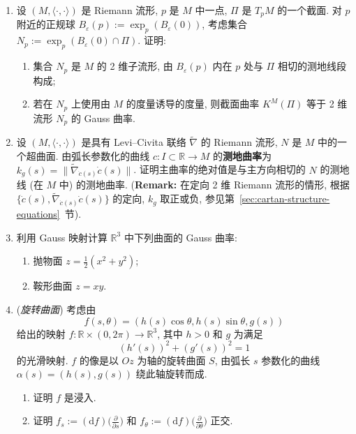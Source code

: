 \begin{RiemannExercise}
\begin{enumerate}[label=(\arabic*),ref=\arabic*,leftmargin=*]
\[
  |K(p)|=\lim_{D\to p}\frac{\operatorname{vol}(g(D))}{\operatorname{vol}(D)},
\]
其中 $g:V\subset N\to S^n$ 是 Gauss 映射, $D$ 是 $p$ 的邻域, 其直径趋于零.
\item\label{ex:sectional-curvature-by-geodesic-surface} 设 $(M,\langle\cdot,\cdot\rangle)$ 是 Riemann 流形, $p$ 是 $M$ 中一点, $\Pi$ 是 $T_pM$ 的一个截面. 对 $p$ 附近的正规球 $B_\varepsilon(p):=\exp_p(B_\varepsilon(0))$, 考虑集合 $N_p:=\exp_p(B_\varepsilon(0)\cap\Pi)$. 证明:
\begin{enumerate}[label=(\alph*),leftmargin=*]
\item 集合 $N_p$ 是 $M$ 的 2 维子流形, 由 $B_\varepsilon(p)$ 内在 $p$ 处与 $\Pi$ 相切的测地线段构成;
\item 若在 $N_p$ 上使用由 $M$ 的度量诱导的度量, 则截面曲率 $K^M(\Pi)$ 等于 2 维流形 $N_p$ 的 Gauss 曲率.
\end{enumerate}
\item\label{ex:principal-curvatures-from-geodesic-curvatures} 设 $(M,\langle\cdot,\cdot\rangle)$ 是具有 Levi–Civita 联络 $\widetilde\nabla$ 的 Riemann 流形, $N$ 是 $M$ 中的一个超曲面. 由弧长参数化的曲线 $c:I\subset\mathbb{R}\to M$ 的\textbf{测地曲率}为 $k_g(s)=\lVert\widetilde\nabla_{\dot c(s)}\dot c(s)\rVert$. 证明主曲率的绝对值是与主方向相切的 $N$ 的测地线 (在 $M$ 中) 的测地曲率.
{\small (\textbf{Remark:} 在定向 2 维 Riemann 流形的情形, 根据 $\{\dot c(s),\widetilde\nabla_{\dot c(s)}\dot c(s)\}$ 的定向, $k_g$ 取正或负, 参见第~\ref{sec:cartan-structure-equations}~节).}
\item\label{ex:gauss-maps-of-paraboloid-and-saddle} 利用 Gauss 映射计算 $\mathbb{R}^3$ 中下列曲面的 Gauss 曲率:
\begin{enumerate}[label=(\alph*),leftmargin=*]
\item 抛物面 $z=\frac12(x^2+y^2)$;
\item 鞍形曲面 $z=xy$.
\end{enumerate}
\item\label{ex:fundamental-forms-of-surfaces-of-revolution} (\emph{旋转曲面}) 考虑由
\[
  f(s,\theta)=(h(s)\cos\theta,h(s)\sin\theta,g(s))
\]
给出的映射 $f:\mathbb{R}\times(0,2\pi)\to\mathbb{R}^3$, 其中 $h>0$ 和 $g$ 为满足
\[
  (h'(s))^2+(g'(s))^2=1
\]
的光滑映射. $f$ 的像是以 $Oz$ 为轴的旋转曲面 $S$, 由弧长 $s$ 参数化的曲线 $\alpha(s)=(h(s),g(s))$ 绕此轴旋转而成.
\begin{enumerate}[label=(\alph*),leftmargin=*]
\item 证明 $f$ 是浸入.
\item 证明 $f_s:=(\mathrm{d}f)\bigl(\frac{\partial}{\partial s}\bigr)$ 和 $f_\theta:=(\mathrm{d}f)\bigl(\frac{\partial}{\partial\theta}\bigr)$ 正交.

\end{enumerate}
\end{enumerate}
\end{RiemannExercise}

